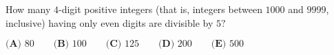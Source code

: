 How many $4$-digit positive integers (that is, integers between $1000$ and $9999$, inclusive) having only even digits are divisible by $5?$

$\textbf{(A) } 80 \qquad \textbf{(B) } 100 \qquad \textbf{(C) } 125 \qquad \textbf{(D) } 200 \qquad \textbf{(E) } 500$